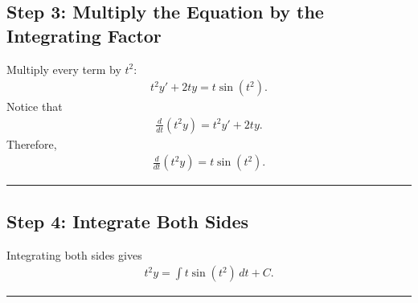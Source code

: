 \documentclass[letterpaper,10pt,english]{sphinxmanual}
\begin{document}
\subsection{Step 3: Multiply the Equation by the Integrating Factor}
\label{\detokenize{Language/Science_language/ODE_calculus/course_MATH_3035/homework_assignments/index_pdf:step-3-multiply-the-equation-by-the-integrating-factor}}
\sphinxAtStartPar
Multiply every term by \(t^2\):
\begin{equation*}
\begin{split}t^2y' + 2ty = t\sin(t^2).\end{split}
\end{equation*}
\sphinxAtStartPar
Notice that
\begin{equation*}
\begin{split}\frac{d}{dt}(t^2y)
=
t^2y' + 2ty.\end{split}
\end{equation*}
\sphinxAtStartPar
Therefore,
\begin{equation*}
\begin{split}\frac{d}{dt}(t^2y)
=
t\sin(t^2).\end{split}
\end{equation*}

\bigskip\hrule\bigskip



\subsection{Step 4: Integrate Both Sides}
\label{\detokenize{Language/Science_language/ODE_calculus/course_MATH_3035/homework_assignments/index_pdf:id4}}
\sphinxAtStartPar
Integrating both sides gives
\begin{equation*}
\begin{split}t^2y
=
\int t\sin(t^2)\,dt + C.\end{split}
\end{equation*}

\bigskip\hrule\bigskip
\end{document}
